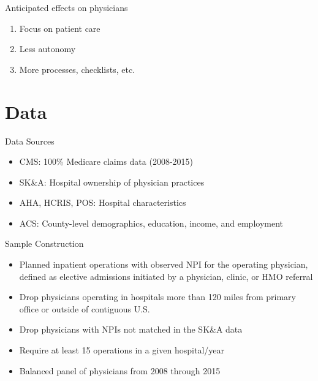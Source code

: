 \documentclass[t]{beamer}
\begin{document}
\begin{frame}{Anticipated effects on physicians}
    \begin{enumerate}
        \item Focus on patient care
        \item Less autonomy
        \item More processes, checklists, etc.
    \end{enumerate}
\end{frame}


\section{Data}
\begin{frame}{Data Sources}
    \begin{itemize}
        \item<1-> CMS: 100\% Medicare claims data (2008-2015)
        \item<2-> SK\&A: Hospital ownership of physician practices
        \item<3-> AHA, HCRIS, POS: Hospital characteristics
        \item<4-> ACS: County-level demographics, education, income, and employment
    \end{itemize}
\end{frame}

\begin{frame}{Sample Construction}
    \begin{itemize}
        \item<1-> Planned inpatient operations with observed NPI for the operating physician, defined as elective admissions initiated by a physician, clinic, or HMO referral
        \item<2-> Drop physicians operating in hospitals more than 120 miles from primary office or outside of contiguous U.S.
        \item<3-> Drop physicians with NPIs not matched in the SK\&A data
        \item<4-> Require at least 15 operations in a given hospital/year
        \item<5-> Balanced panel of physicians from 2008 through 2015
    \end{itemize}
\end{frame}
\end{document}
